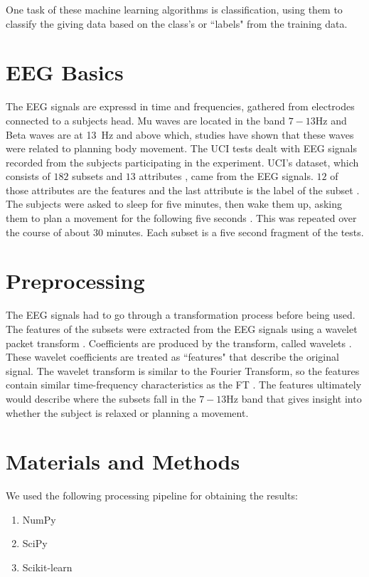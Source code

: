 \documentclass[conference,compsoc]{IEEEtran}
\begin{document}
One task of these machine learning algorithms is classification, using them to classify the giving data based on the class's or ``labels" from the training data. 

\section{EEG Basics}
The EEG signals are expressd in time and frequencies, gathered from electrodes connected to a subjects head. 
Mu waves are located in the band $7 -13\si{\hertz}$ and Beta waves are at \SI{13}{\hertz} and above \cite{classsvm} which, 
studies have shown that these waves were related to planning body movement.
The UCI tests dealt with EEG signals recorded from the subjects participating in the experiment.  UCI's dataset, which consists of $182$ subsets and $13$ attributes \cite{classsvm}, 
came from the EEG signals. $12$ of those attributes are the features and the last attribute is the label of the subset \cite{online}. 
The subjects were asked to sleep for five minutes, then wake them up, asking them to plan a movement for the following five seconds \cite{classsvm}. This was repeated over 
the course of about 30 minutes. Each subset is a five second fragment of the tests.

\section{Preprocessing}
The EEG signals had to go through a transformation process before being used.
The features of the subsets were extracted from the EEG signals using a wavelet packet 
transform \cite{online}. Coefficients are produced by the transform, called wavelets \cite{wavelet}. These wavelet coefficients are treated as ``features" that describe the 
original signal. The wavelet transform is similar to the Fourier Transform, so the features contain similar time-frequency characteristics as the FT \cite{packet}. 
The features ultimately would describe where the subsets fall in the $7-13\si{\hertz}$ band that gives insight into whether the subject is relaxed or planning a movement.

\section{Materials and Methods}
We used the following processing pipeline for obtaining the results:
\begin{enumerate}
\item NumPy
\item SciPy
\item Scikit-learn
\end{enumerate}
\end{document}
